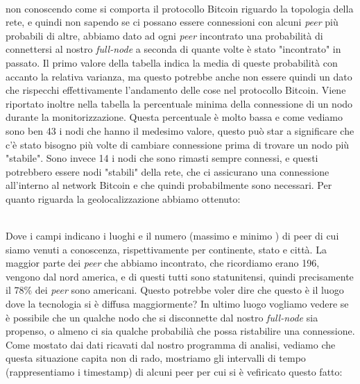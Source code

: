 \\non conoscendo come si comporta il protocollo Bitcoin riguardo la topologia della rete, e quindi non sapendo se ci possano essere connessioni con alcuni \textit{peer} pi\`u probabili di altre, abbiamo dato ad ogni \textit{peer} incontrato una probabilit\`a di connettersi al nostro \textit{full-node} a seconda di quante volte \`e stato "incontrato" in passato.
Il primo valore della tabella indica la media di queste probabilit\`a con accanto la relativa varianza, ma questo potrebbe anche non essere quindi un dato che rispecchi effettivamente l'andamento delle cose nel protocollo Bitcoin.
Viene riportato inoltre nella tabella la percentuale minima della connessione di un nodo durante la monitorizzazione. Questa percentuale \`e molto bassa e come vediamo sono ben 43 i nodi che hanno il medesimo valore, questo pu\`o star a significare che c'\`e stato bisogno pi\`u volte di cambiare connessione prima di trovare un nodo pi\`u "stabile". Sono invece 14 i nodi che sono rimasti sempre connessi, e questi potrebbero essere nodi "stabili" della rete, che ci assicurano una connessione all'interno al network Bitcoin e che quindi probabilmente sono necessari.
Per quanto riguarda la geolocalizzazione abbiamo ottenuto:\\
\begin{table}[h!]
    \label{tab:table1}
\end{table}
\\Dove i campi indicano i luoghi e il numero (massimo e minimo ) di peer di cui siamo venuti a conoscenza, rispettivamente per continente, stato e citt\`a.
La maggior parte dei \textit{peer} che abbiamo incontrato, che ricordiamo erano 196, vengono dal nord america, e di questi tutti sono statunitensi, quindi precisamente il 78\% dei \textit{peer} sono americani. Questo potrebbe voler dire che questo \`e il luogo dove la tecnologia si \`e diffusa maggiormente?
In ultimo luogo vogliamo vedere se \`e possibile che un qualche nodo che si disconnette dal nostro \textit{full-node} sia propenso, o almeno ci sia qualche probabili\`a che possa ristabilire una connessione.
Come mostato dai dati ricavati dal nostro programma di analisi, vediamo che questa situazione capita non di rado, mostriamo gli intervalli di tempo (rappresentiamo i timestamp) di alcuni peer per cui si \`e vefiricato questo fatto:

